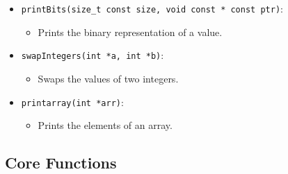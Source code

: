 \documentclass{article}
\begin{document}
\begin{itemize}
    \item \texttt{printBits(size\_t const size, void const * const ptr)}:
    \begin{itemize}
        \item Prints the binary representation of a value.
    \end{itemize}
    \item \texttt{swapIntegers(int *a, int *b)}:
    \begin{itemize}
        \item Swaps the values of two integers.
    \end{itemize}
    \item \texttt{printarray(int *arr)}:
    \begin{itemize}
        \item Prints the elements of an array.
    \end{itemize}
\end{itemize}

\subsection{Core Functions}
\end{document}
